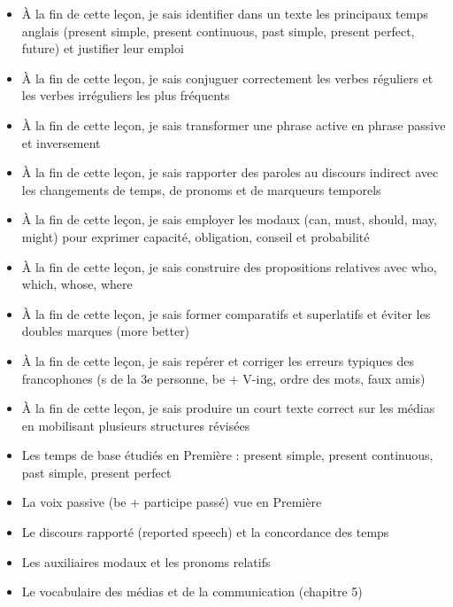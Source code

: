 \documentclass[11pt]{article}
\begin{document}
\begin{objectifs}
\begin{itemize}
\item À la fin de cette leçon, je sais identifier dans un texte les principaux temps anglais (present simple, present continuous, past simple, present perfect, future) et justifier leur emploi
\item À la fin de cette leçon, je sais conjuguer correctement les verbes réguliers et les verbes irréguliers les plus fréquents
\item À la fin de cette leçon, je sais transformer une phrase active en phrase passive et inversement
\item À la fin de cette leçon, je sais rapporter des paroles au discours indirect avec les changements de temps, de pronoms et de marqueurs temporels
\item À la fin de cette leçon, je sais employer les modaux (can, must, should, may, might) pour exprimer capacité, obligation, conseil et probabilité
\item À la fin de cette leçon, je sais construire des propositions relatives avec who, which, whose, where
\item À la fin de cette leçon, je sais former comparatifs et superlatifs et éviter les doubles marques (more better)
\item À la fin de cette leçon, je sais repérer et corriger les erreurs typiques des francophones (s de la 3e personne, be + V-ing, ordre des mots, faux amis)
\item À la fin de cette leçon, je sais produire un court texte correct sur les médias en mobilisant plusieurs structures révisées
\end{itemize}
\end{objectifs}

\begin{prerequis}
\begin{itemize}
\item Les temps de base étudiés en Première : present simple, present continuous, past simple, present perfect
\item La voix passive (be + participe passé) vue en Première
\item Le discours rapporté (reported speech) et la concordance des temps
\item Les auxiliaires modaux et les pronoms relatifs
\item Le vocabulaire des médias et de la communication (chapitre 5)
\end{itemize}
\end{prerequis}
\end{document}
